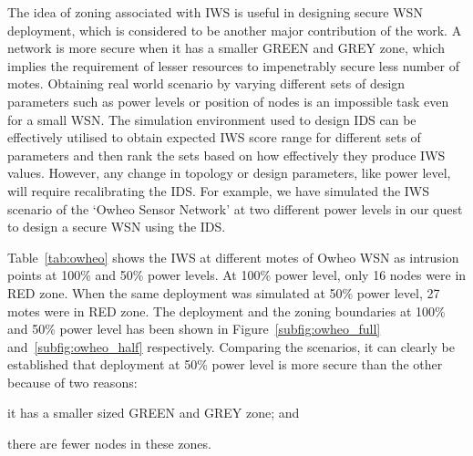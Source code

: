 \documentclass[conference]{IEEEtran}
\begin{document}
The idea of zoning associated with IWS is useful in designing secure WSN deployment, which is considered to be another major contribution of the work.
A network is more secure when it has a smaller GREEN and GREY zone, which implies the requirement of lesser resources to impenetrably secure less number of motes.
Obtaining real world scenario by varying different sets of design parameters such as power levels or position of nodes is an impossible task even for a small WSN.
The simulation environment used to design IDS can be effectively utilised to obtain expected IWS score range for different sets of parameters and then rank the sets based on how effectively they produce IWS values. 
However, any change in topology or design parameters, like power level, will require recalibrating the IDS. 
For example, we have simulated the IWS scenario of the `Owheo Sensor Network' 
at two different power levels in our quest to design a secure WSN using the IDS.

Table~\ref{tab:owheo} shows the IWS at different motes of Owheo WSN as intrusion points at 100\% and 50\% power levels. 
At 100\% power level, %
only 16 nodes were in RED zone.
When the same deployment was simulated at 50\% power level, %
27 motes were in RED zone.
The deployment and the zoning boundaries at 100\% and  50\% power level has been shown in Figure~\ref{subfig:owheo_full} and~\ref{subfig:owheo_half} respectively.
Comparing the scenarios, it can clearly be established that deployment at 50\% power level is more secure than the other because of two reasons:
\begin{inparaenum}
\item it has a smaller sized GREEN and GREY zone; and 
\item there are fewer nodes in these zones. 
\end{inparaenum}
\end{document}

